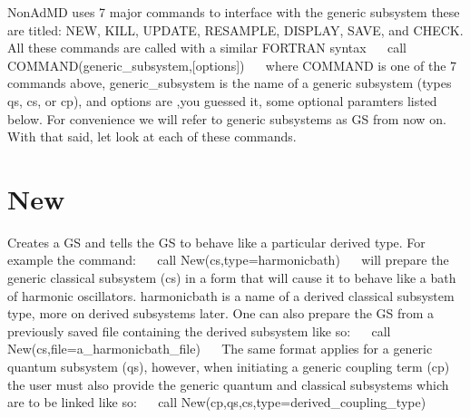 Non\+Ad\+MD uses 7 major commands to interface with the generic subsystem these are titled\+: N\+EW, K\+I\+LL, U\+P\+D\+A\+TE, R\+E\+S\+A\+M\+P\+LE, D\+I\+S\+P\+L\+AY, S\+A\+VE, and C\+H\+E\+CK. All these commands are called with a similar F\+O\+R\+T\+R\+AN syntax~\newline
~\newline
call C\+O\+M\+M\+A\+N\+D(generic\+\_\+subsystem,\mbox{[}options\mbox{]})~\newline
~\newline
 where \textquotesingle{}C\+O\+M\+M\+A\+ND\textquotesingle{} is one of the 7 commands above, \textquotesingle{}generic\+\_\+subsystem\textquotesingle{} is the name of a generic subsystem (types qs, cs, or cp), and \textquotesingle{}options\textquotesingle{} are ,you guessed it, some optional paramters listed below. For convenience we will refer to generic subsystems as GS from now on. With that said, let look at each of these commands.~\newline
\hypertarget{_interface_New}{}\section{New}\label{_interface_New}
Creates a GS and tells the GS to behave like a particular derived type. For example the command\+:~\newline
 ~\newline
 call New(cs,type=\textquotesingle{}harmonicbath\textquotesingle{})~\newline
~\newline
will prepare the generic classical subsystem (cs) in a form that will cause it to behave like a bath of harmonic oscillators. \textquotesingle{}harmonicbath\textquotesingle{} is a name of a derived classical subsystem type, more on derived subsystems later. One can also prepare the GS from a previously saved file containing the derived subsystem like so\+:~\newline
~\newline
 call New(cs,file=\textquotesingle{}a\+\_\+harmonicbath\+\_\+file\textquotesingle{})~\newline
~\newline
The same format applies for a generic quantum subsystem (qs), however, when initiating a generic coupling term (cp) the user must also provide the generic quantum and classical subsystems which are to be linked like so\+:~\newline
~\newline
 call New(cp,qs,cs,type=\textquotesingle{}derived\+\_\+coupling\+\_\+type\textquotesingle{})~\newline
